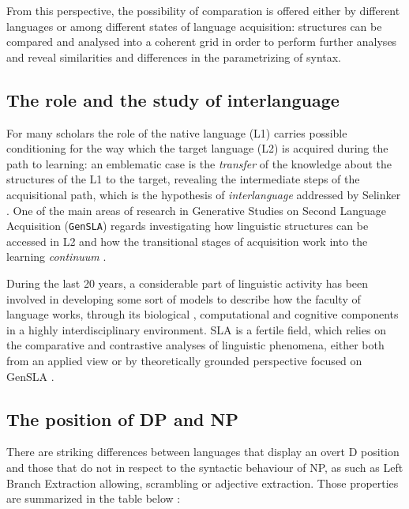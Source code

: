 \documentclass[
  a4paper,
  twoside,
  12pt,
  chapterprefix=false,
  listof=flat]{scrartcl}
\theoremstyle{plain} %
\theoremstyle{definition}
\theoremstyle{remark}
\begin{document}
From this perspective, the possibility of comparation is offered either by different languages or among different states of language acquisition: structures can be compared and analysed into a coherent grid in order to perform further analyses and reveal similarities and differences in the parametrizing of syntax.

\hypertarget{the-role-and-the-study-of-interlanguage}{%
\subsection{The role and the study of interlanguage}\label{the-role-and-the-study-of-interlanguage}}

For many scholars the role of the native language (L1) carries possible conditioning for the way which the target language (L2) is acquired during the path to learning: an emblematic case is the \emph{transfer} of the knowledge about the structures of the L1 to the target, revealing the intermediate steps of the acquisitional path, which is the hypothesis of \emph{interlanguage} addressed by Selinker \citep{selinker1972}.
One of the main areas of research in Generative Studies on Second Language Acquisition (\texttt{GenSLA}) regards investigating how linguistic structures can be accessed in L2 and how the transitional stages of acquisition work into the learning \emph{continuum} \citep{rothmanslabakova2017}.

During the last 20 years, a considerable part of linguistic activity has been involved in developing some sort of models to describe how the faculty of language works, through its biological \citep{hcf2002}, computational \citep{fodor2001} and cognitive components in a highly interdisciplinary environment.
SLA is a fertile field, which relies on the comparative and contrastive analyses of linguistic phenomena, either both from an applied view \citep{ellis1994} or by theoretically grounded perspective focused on GenSLA \citep{guasti2002, hawkins2001, rothmanslabakova2017, sorace2011}.

\hypertarget{the-position-of-dp-and-np}{%
\subsection{The position of DP and NP}\label{the-position-of-dp-and-np}}

There are striking differences between languages that display an overt D position and those that do not in respect to the syntactic behaviour of NP, as such as Left Branch Extraction allowing, scrambling or adjective extraction. Those properties are summarized in the table below \citep[in][ from \citet{boskovic2009}]{salzmann2018}:
\end{document}
